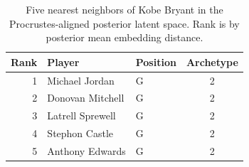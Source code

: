 \begin{table}[htbp]
  \centering\small
  \begin{tabular}{rllc}
    \toprule
    Rank & Player & Position & Archetype \\
    \midrule
    1 & Michael Jordan & G & 2 \\
    2 & Donovan Mitchell & G & 2 \\
    3 & Latrell Sprewell & G & 2 \\
    4 & Stephon Castle & G & 2 \\
    5 & Anthony Edwards & G & 2 \\
    \bottomrule
  \end{tabular}
  \caption{Five nearest neighbors of Kobe Bryant in the Procrustes-aligned posterior latent space. Rank is by posterior mean embedding distance.}
  \label{tab:Kobe_Bryant_neighbors}
\end{table}

